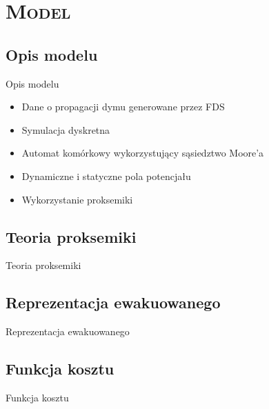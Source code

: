 \section{\scshape Model}

\subsection{Opis modelu}
\begin{frame}{Opis modelu}
	\begin{itemize}
	\item Dane o propagacji dymu generowane przez FDS
	\item Symulacja dyskretna
	\item Automat komórkowy wykorzystujący sąsiedztwo Moore'a
	\item Dynamiczne i statyczne pola potencjału
	\item Wykorzystanie proksemiki
	\end{itemize}
\end{frame}

\subsection{Teoria proksemiki}
\begin{frame}{Teoria proksemiki}
\end{frame}

\subsection{Reprezentacja ewakuowanego}
\begin{frame}{Reprezentacja ewakuowanego}
\end{frame}

\subsection{Funkcja kosztu}
\begin{frame}{Funkcja kosztu}
\end{frame}